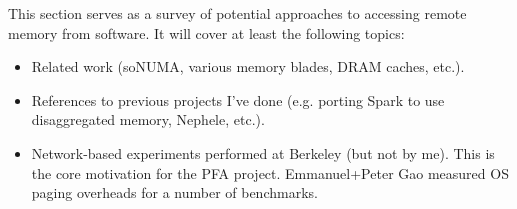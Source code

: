This section serves as a survey of potential approaches to accessing remote memory from software. It will cover at least the following topics:

\begin{itemize}
    \item Related work (soNUMA, various memory blades, DRAM caches, etc.). \cite{sonuma}
    \item References to previous projects I've done (e.g. porting Spark to use disaggregated memory, Nephele, etc.).
    \item Network-based experiments performed at Berkeley (but not by me). This is the core motivation for the PFA project. Emmanuel+Peter Gao measured OS paging overheads for a number of benchmarks.
\end{itemize}
